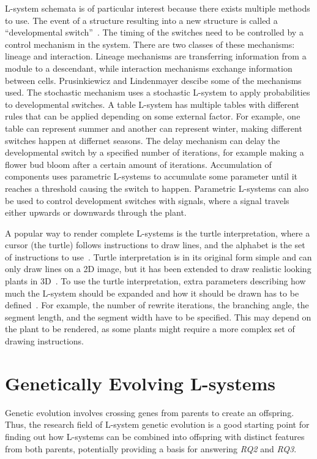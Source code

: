 L-system schemata is of particular interest because there exists multiple methods to use.
The event of a structure resulting into a new structure is called a ``developmental switch''~\cite{Prusinkiewicz2012}.
The timing of the switches need to be controlled by a control mechanism in the system.
There are two classes of these mechanisms: lineage and interaction.
Lineage mechanisms are transferring information from a module to a descendant, while interaction mechanisms exchange information between cells.
Prusinkiewicz and Lindenmayer descibe some of the mechanisms used.
The stochastic mechanism uses a stochastic L-system to apply probabilities to developmental switches.
A table L-system has multiple tables with different rules that can be applied depending on some external factor.
For example, one table can represent summer and another can represent winter, making different switches happen at differnet seasons.
The delay mechanism can delay the developmental switch by a specified number of iterations, for example making a flower bud bloom after a certain amount of iterations.
Accumulation of components uses parametric L-systems to accumulate some parameter until it reaches a threshold causing the switch to happen.
Parametric L-systems can also be used to control development switches with signals, where a signal travels either upwards or downwards through the plant.~\cite{Prusinkiewicz2012}

A popular way to render complete L-systems is the turtle interpretation, where a cursor (the turtle) follows instructions to draw lines, and the alphabet is the set of instructions to use~\cite{Prusinkiewicz2012}.
Turtle interpretation is in its original form simple and can only draw lines on a 2D image, but it has been extended to draw realistic looking plants in 3D~\cite{Prusinkiewicz1988}.
To use the turtle interpretation, extra parameters describing how much the L-system should be expanded and how it should be drawn has to be defined~\cite{Prusinkiewicz2012}.
For example, the number of rewrite iterations, the branching angle, the segment length, and the segment width have to be specified.
This may depend on the plant to be rendered, as some plants might require a more complex set of drawing instructions.

\section{Genetically Evolving L-systems}
Genetic evolution involves crossing genes from parents to create an offspring.
Thus, the research field of L-system genetic evolution is a good starting point for finding out how L-systems can be combined into offspring with distinct features from both parents, potentially providing a basis for answering \textit{RQ2} and \textit{RQ3}.

